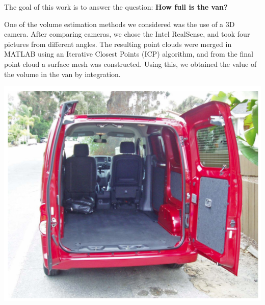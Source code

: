 \documentclass[a0paper,portrait]{baposter}
\begin{document}
\begin{poster}
{The goal of this work is to answer the question: \textbf{How full is the van?}

One of the volume estimation methods we considered was the use of a 3D camera. After comparing cameras, we chose the Intel RealSense, and took four pictures from different angles. The resulting point clouds were merged in MATLAB using an Iterative Closest Points (ICP) algorithm, and from the final point cloud a surface mesh was constructed. Using this, we obtained the value of the volume in the van by integration.

\begin{center}
\includegraphics[width=0.8\linewidth]{van}
\end{center}
}




\end{poster}
\end{document}
